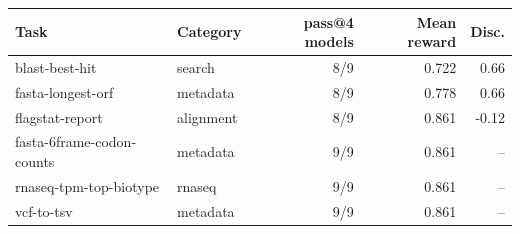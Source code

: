 \begin{tabular}{llrrr}
\toprule
Task & Category & pass@4 models & Mean reward & Disc. \\
\midrule
blast-best-hit & search & 8/9 & 0.722 & 0.66 \\
fasta-longest-orf & metadata & 8/9 & 0.778 & 0.66 \\
flagstat-report & alignment & 8/9 & 0.861 & -0.12 \\
fasta-6frame-codon-counts & metadata & 9/9 & 0.861 & -- \\
rnaseq-tpm-top-biotype & rnaseq & 9/9 & 0.861 & -- \\
vcf-to-tsv & metadata & 9/9 & 0.861 & -- \\
\bottomrule
\end{tabular}
